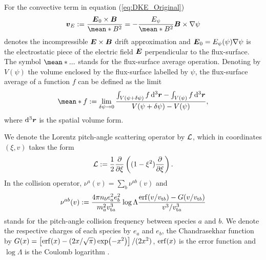 For the convective term in equation (\ref{eq:DKE_Original})
%
\begin{align}
	\vb*{v}_E 
	:= 
	\frac{\vb*{E}_0\times\vb*{B}}{\mean*{B^2}} 
	= 
	- 
	\frac{E_\psi}{\mean*{B^2}}\vb*{B}\times \nabla\psi
	\label{eq:Incompressible_ExB_definition}
\end{align}
denotes the incompressible $\vb*{E}\times\vb*{B}$ drift approximation \cite{dherbemont2022} and $\vb*{E}_0 = E_\psi(\psi) \nabla \psi$ is the electrostatic piece of the electric field $\vb*{E}$ perpendicular to the flux-surface. The symbol $\mean*{...}$ stands for the flux-surface average operation. Denoting by $V(\psi)$ the volume enclosed by the flux-surface labelled by $\psi$, the flux-surface average of a function $f$ can be defined as the limit
%
\begin{align}
	\mean*{f}
	:=
	\lim_{\delta \psi \rightarrow 0} 
	\dfrac{\int_{V(\psi+\delta\psi)} f \dd[3]{\vb*{r}}- \int_{V(\psi)} f\dd[3]{\vb*{r}}}
	{V(\psi+\delta\psi) - V(\psi)},
	\label{eq:FSA}
\end{align}
where $\dd[3]{\vb*{r}}$ is the spatial volume form.

We denote the Lorentz pitch-angle scattering operator by $\mathcal{L}$, which in coordinates $(\xi,v)$ takes the form
\begin{align}
 \mathcal{L}   := \frac{1}{2}  \pdv{\xi}\left( (1-\xi^2)\pdv{}{\xi} \right).
 \label{eq:Pitch_angle_scattering_operator}
\end{align}
In the collision operator, $\nu^a(v) =\sum_{b}\nu^{ab}(v)$ and
%
\begin{align}
	\nu^{ab}(v) := 
	\frac{4 \pi n_b e_a^2 e_b^2}
	{m_a^2 v_{\text{t}a}^3}
	\log\Lambda
	\frac{ \erf(v/v_{\text{t}b}) - G(v/v_{\text{t}b})}{v^3/v_{\text{t}a}^3}
\end{align}
stands for the pitch-angle collision frequency between species $a$ and $b$. We denote the respective charges of each species by $e_a$ and $e_b$, the Chandrasekhar function by $G(x)=\left[\erf(x) - (2x/\sqrt{\pi}) \exp(-x^2)\right]/(2x^2)$, $\erf(x)$ is the error function and $\log\Lambda$ is the Coulomb logarithm \cite{Helander_2005}. 
 




